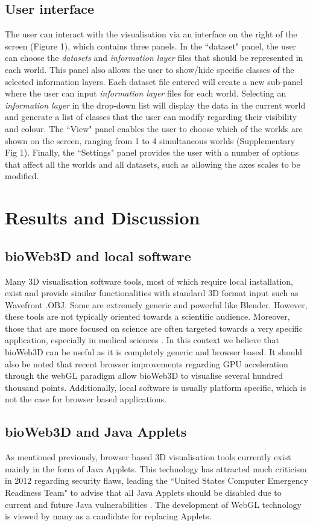 \documentclass[10pt]{bmc_article}
\newenvironment{bmcformat}{\baselineskip20pt\sloppy\setboolean{publ}{false}}{\baselineskip20pt\sloppy}
\begin{document}
\begin{bmcformat}
	
\subsection{User interface}
The user can interact with the visualisation via an interface on the right of the screen (Figure 1), which contains three panels. In the ``dataset" panel, the user can choose the {\it{datasets}} and {\it{information layer}} files that should be represented in each world. This panel also allows the user to show/hide specific classes of the selected information layers. Each dataset file entered will create a new sub-panel where the user can input {\it{information layer}} files for each world. Selecting an {\it{information layer}} in the drop-down list will display the data in the current world and generate a list of classes that the user can modify regarding their visibility and colour. The ``View" panel enables the user to choose which of the worlds are shown on the screen, ranging from 1 to 4 simultaneous worlds (Supplementary Fig 1). Finally, the ``Settings" panel provides the user with a number of options that affect all the worlds and all datasets, such as allowing the axes scales to be modified.


\section{Results and Discussion}


	\subsection{bioWeb3D and local software}
Many 3D visualisation software tools, most of which require local installation, exist and provide similar functionalities with standard 3D format input such as Wavefront .OBJ. Some are extremely generic and powerful like Blender. However, these tools are not typically oriented towards a scientific audience. Moreover, those that are more focused on science are often targeted towards a very specific application, especially in medical sciences \cite{Wang09}. In this context we believe that bioWeb3D can be useful as it is completely generic and browser based. It should also be noted that recent browser improvements regarding GPU acceleration through the webGL paradigm allow bioWeb3D to visualise several hundred thousand points. Additionally, local software is usually platform specific, which is not the case for browser based applications.

	\subsection{bioWeb3D and Java Applets}
As mentioned previously, browser based 3D visualisation tools currently exist mainly in the form of Java Applets. This technology has attracted much criticism in 2012 regarding security flaws, leading the ``United States Computer Emergency Readiness Team" to advise that all Java Applets should be disabled due to current and future Java vulnerabilities \cite{security}. The development of WebGL technology is viewed by many as a candidate for replacing Applets. 




\end{bmcformat}
\end{document}
